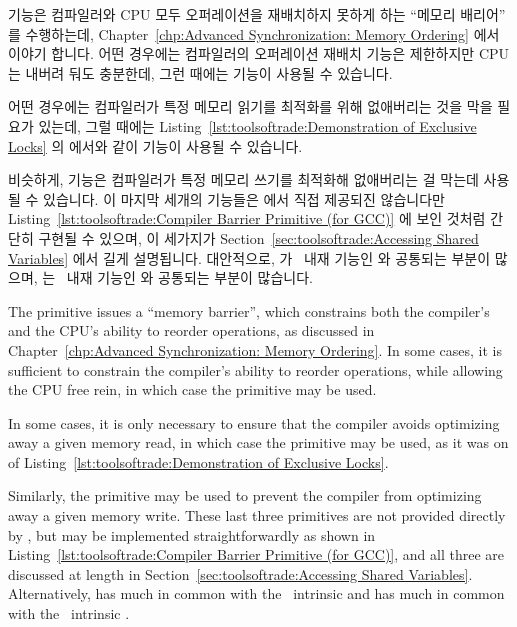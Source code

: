  기능은 컴파일러와 CPU 모두 오퍼레이션을 재배치하지
못하게 하는 ``메모리 배리어'' 를 수행하는데,
Chapter~\ref{chp:Advanced Synchronization: Memory Ordering}
에서 이야기 합니다.
어떤 경우에는 컴파일러의 오퍼레이션 재배치 기능은 제한하지만 CPU 는 내버려 둬도
충분한데, 그런 때에는  기능이 사용될 수 있습니다.
\begin{fcvref}
어떤 경우에는 컴파일러가 특정 메모리 읽기를 최적화를 위해 없애버리는 것을 막을
필요가 있는데, 그럴 때에는
Listing~\ref{lst:toolsoftrade:Demonstration of Exclusive Locks}
의  에서와 같이  기능이 사용될 수 있습니다.
\end{fcvref}
비슷하게,  기능은 컴파일러가 특정 메모리 쓰기를 최적화해
없애버리는 걸 막는데 사용될 수 있습니다.
이 마지막 세개의 기능들은 \GCC 에서 직접 제공되진 않습니다만
Listing~\ref{lst:toolsoftrade:Compiler Barrier Primitive (for GCC)}
에 보인 것처럼 간단히 구현될 수 있으며, 이 세가지가
Section~\ref{sec:toolsoftrade:Accessing Shared Variables}
에서 길게 설명됩니다.
대안적으로,  가 \GCC\ 내재 기능인 
와 공통되는 부분이 많으며,  는 \GCC\ 내재 기능인
 와
공통되는 부분이 많습니다.

\iffalse

The  primitive issues a ``memory barrier'',
which constrains both the compiler's and the CPU's ability to reorder
operations, as discussed in
Chapter~\ref{chp:Advanced Synchronization: Memory Ordering}.
In some cases, it is sufficient to constrain the compiler's ability
to reorder operations, while allowing the CPU free rein, in which
case the  primitive may be used.
\begin{fcvref}
In some cases, it is only necessary to ensure that the compiler
avoids optimizing away a given memory read, in which case the
 primitive may be used, as it was on  of
Listing~\ref{lst:toolsoftrade:Demonstration of Exclusive Locks}.
\end{fcvref}
Similarly, the  primitive may be used to prevent the
compiler from optimizing away a given memory write.
These last three primitives are not provided directly by \GCC,
but may be implemented straightforwardly as shown in
Listing~\ref{lst:toolsoftrade:Compiler Barrier Primitive (for GCC)},
and all three are discussed at length in
Section~\ref{sec:toolsoftrade:Accessing Shared Variables}.
Alternatively,  has much in common with
the \GCC\  intrinsic
and  has much in common with the \GCC\ 
intrinsic .

